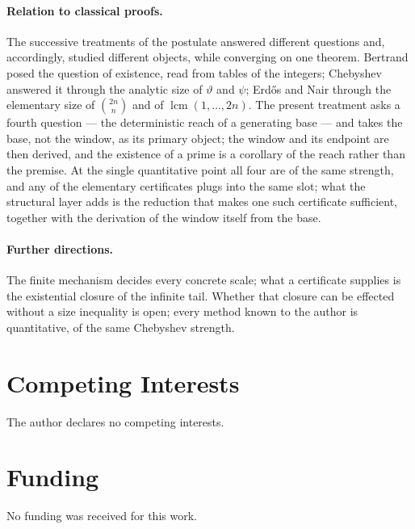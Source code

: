 \documentclass[11pt,a4paper]{amsart}
\theoremstyle{plain}
\theoremstyle{definition}
\theoremstyle{plain}
\theoremstyle{remark}
\begin{document}
\paragraph{Relation to classical proofs.}
The successive treatments of the postulate answered different questions and, accordingly,
studied different objects, while converging on one theorem. Bertrand \cite{bertrand1845} posed
the question of existence, read from tables of the integers; Chebyshev \cite{chebyshev1852}
answered it through the analytic size of $\vartheta$ and $\psi$; Erd\H{o}s \cite{erdos1932} and
Nair \cite{nair1982} through the elementary size of $\binom{2n}{n}$ and of
$\operatorname{lcm}(1,\dots,2n)$. The present treatment asks a fourth question --- the
deterministic reach of a generating base --- and takes the base, not the window, as its primary
object; the window and its endpoint are then derived, and the existence of a prime is a
corollary of the reach rather than the premise. At the single quantitative point all four are
of the same strength, and any of the elementary certificates plugs into the same slot; what the
structural layer adds is the reduction that makes one such certificate sufficient, together with
the derivation of the window itself from the base.

\paragraph{Further directions.}
The finite mechanism decides every concrete scale; what a certificate supplies is the
existential closure of the infinite tail. Whether that closure can be effected without a
size inequality is open; every method known to the author is quantitative, of the same
Chebyshev strength.

\section*{Competing Interests}
The author declares no competing interests.

\section*{Funding}
No funding was received for this work.

\printbibliography
\end{document}
